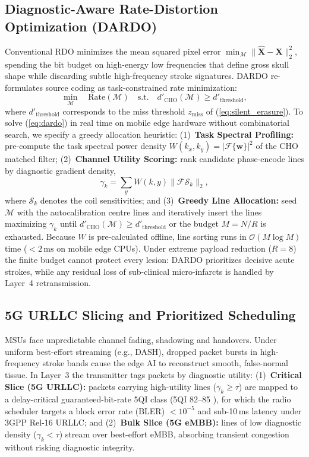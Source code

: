 \documentclass[conference]{IEEEtran}
\begin{document}
\subsection{Diagnostic-Aware Rate-Distortion Optimization (DARDO)}
Conventional RDO minimizes the mean squared pixel error $\min_{\mathcal{M}} \|\hat{\mathbf{X}} - \mathbf{X}\|_2^2$, spending the bit budget on high-energy low frequencies that define gross skull shape while discarding subtle high-frequency stroke signatures. DARDO re-formulates source coding as task-constrained rate minimization:
\begin{equation}
\min_{\mathcal{M}} \quad \text{Rate}(\mathcal{M}) \quad \text{s.t.} \quad d'_{\text{CHO}}(\mathcal{M}) \ge d'_{\text{threshold}},
\label{eq:dardo}
\end{equation}
where $d'_{\text{threshold}}$ corresponds to the miss threshold $z_{\text{miss}}$ of (\ref{eq:silent_erasure}). To solve (\ref{eq:dardo}) in real time on mobile edge hardware without combinatorial search, we specify a greedy allocation heuristic: (1)~\textbf{Task Spectral Profiling:} pre-compute the task spectral power density $W(k_x, k_y) = |\mathcal{F}\{\mathbf{w}\}|^2$ of the CHO matched filter; (2)~\textbf{Channel Utility Scoring:} rank candidate phase-encode lines by diagnostic gradient density,
\begin{equation}
\gamma_k = \sum_{y} W(k, y) \|\mathcal{F}\mathcal{S}_k\|_2 ,
\label{eq:gamma}
\end{equation}
where $\mathcal{S}_k$ denotes the coil sensitivities; and (3)~\textbf{Greedy Line Allocation:} seed $\mathcal{M}$ with the autocalibration centre lines and iteratively insert the lines maximizing $\gamma_k$ until $d'_{\text{CHO}}(\mathcal{M}) \ge d'_{\text{threshold}}$ or the budget $M = N/R$ is exhausted. Because $W$ is pre-calculated offline, line sorting runs in $\mathcal{O}(M\log M)$ time ($<2\,\text{ms}$ on mobile edge CPUs). Under extreme payload reduction ($R=8$) the finite budget cannot protect every lesion: DARDO prioritizes decisive acute strokes, while any residual loss of sub-clinical micro-infarcts is handled by Layer~4 retransmission.

\subsection{5G URLLC Slicing and Prioritized Scheduling}
MSUs face unpredictable channel fading, shadowing and handovers. Under uniform best-effort streaming (e.g., DASH), dropped packet bursts in high-frequency stroke bands cause the edge AI to reconstruct smooth, false-normal tissue. In Layer~3 the transmitter tags packets by diagnostic utility: (1)~\textbf{Critical Slice (5G URLLC):} packets carrying high-utility lines ($\gamma_k \ge \tau$) are mapped to a delay-critical guaranteed-bit-rate 5QI class (5QI 82--85 \cite{3gpp23501}), for which the radio scheduler targets a block error rate (BLER) $<10^{-5}$ and sub-10\,ms latency under 3GPP Rel-16 URLLC; and (2)~\textbf{Bulk Slice (5G eMBB):} lines of low diagnostic density ($\gamma_k < \tau$) stream over best-effort eMBB, absorbing transient congestion without risking diagnostic integrity.
\end{document}
